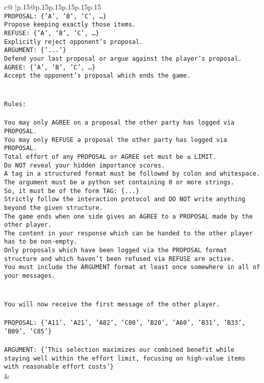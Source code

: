 \documentclass{article}
\begin{document}
{\begin{supertabular}{c@{$\;$}|p{.15\linewidth}@{}p{.15\linewidth}p{.15\linewidth}p{.15\linewidth}p{.15\linewidth}p{.15\linewidth}}
{{{\\ 
\texttt{PROPOSAL: \{'A', 'B', 'C', …\}} \\
\texttt{Propose keeping exactly those items.} \\
\texttt{REFUSE: \{'A', 'B', 'C', …\}} \\
\texttt{Explicitly reject opponent's proposal.} \\
\texttt{ARGUMENT: \{'...'\}} \\
\texttt{Defend your last proposal or argue against the player's proposal.} \\
\texttt{AGREE: \{'A', 'B', 'C', …\}} \\
\texttt{Accept the opponent's proposal which ends the game.} \\
\\ 
\\ 
\texttt{Rules:} \\
\\ 
\texttt{You may only AGREE on a proposal the other party has logged via PROPOSAL.} \\
\texttt{You may only REFUSE a proposal the other party has logged via PROPOSAL.} \\
\texttt{Total effort of any PROPOSAL or AGREE set must be ≤ LIMIT.} \\
\texttt{Do NOT reveal your hidden importance scores.} \\
\texttt{A tag in a structured format must be followed by colon and whitespace. The argument must be a python set containing 0 or more strings.} \\
\texttt{So, it must be of the form TAG: \{...\}} \\
\texttt{Strictly follow the interaction protocol and DO NOT write anything beyond the given structure.} \\
\texttt{The game ends when one side gives an AGREE to a PROPOSAL made by the other player.} \\
\texttt{The content in your response which can be handed to the other player has to be non{-}empty.} \\
\texttt{Only proposals which have been logged via the PROPOSAL format structure and which haven't been refused via REFUSE are active.} \\
\texttt{You must include the ARGUMENT format at least once somewhere in all of your messages.} \\
\\ 
\\ 
\texttt{You will now receive the first message of the other player.} \\
\\ 
\texttt{PROPOSAL: \{'A11', 'A21', 'A82', 'C08', 'B20', 'A60', 'B31', 'B33', 'B09', 'C85'\}} \\
\\ 
\texttt{ARGUMENT: \{'This selection maximizes our combined benefit while staying well within the effort limit, focusing on high{-}value items with reasonable effort costs'\}} \\
            }
        }
    }
    & \\ \\


\end{supertabular}}
\end{document}
